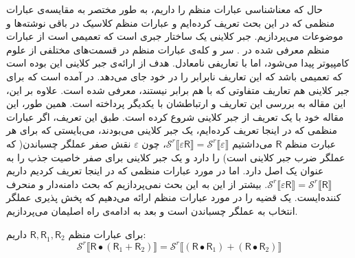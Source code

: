 حال که معناشناسی عبارات منظم را داریم، به طور مختصر به مقایسه‌ی عبارات منظمی که در این بحث تعریف کرده‌ایم و عبارات منظم کلاسیک در باقی نوشته‌ها و موضوعات می‌پردازیم. جبر کلاینی یک ساختار جبری است که تعمیمی است از عبارات منظم معرفی شده در \cite{kleene56}. سر و کله‌ی عبارات منظم در قسمت‌های مختلفی از علوم کامپیوتر پیدا می‌شود، اما با تعاریفی نامعادل. هدف از ارائه‌ی جبر کلاینی این بوده است که تعمیمی باشد که این تعاریف نابرابر را در خود جای می‌دهد. در \cite{DexterKleene} آمده است که برای جبر کلاینی هم تعاریف متفاوتی که با هم برابر نیستند، معرفی شده است. علاوه بر این، این مقاله به بررسی این تعاریف و ارتباطشان با یکدیگر پرداخته است. همین طور، این مقاله خود با یک تعریف از جبر کلاینی شروع کرده است. طبق این تعریف، اگر عبارات منظمی که در اینجا تعریف کرده‌ایم، یک جبر کلاینی می‌بودند، می‌بایستی که برای هر عبارت منظم $\mathsf{R}$ می‌داشتیم
$\mathcal{S}^r \llbracket \mathsf{\varepsilon R} \rrbracket = \mathcal{S}^r \llbracket \mathsf{\varepsilon} \rrbracket$،
چون $\varepsilon$ نقش صفر عملگر چسباندن( که عملگر ضرب جبر کلاینی است) را دارد و یک جبر کلاینی برای صفر خاصیت جذب را به عنوان یک اصل دارد. اما در مورد عبارات منظمی که در اینجا تعریف کردیم داریم 
$\mathcal{S}^r \llbracket \mathsf{\varepsilon R} \rrbracket = \mathcal{S}^r \llbracket \mathsf{R} \rrbracket$.
بیشتر از این به این بحث نمی‌پردازیم که بحث دامنه‌دار و منحرف کننده‌ایست. یک قضیه را در مورد عبارات منظم ارائه می‌دهیم که پخش پذیری عملگر انتخاب به عملگر چسباندن است و بعد به ادامه‌ی راه اصلیمان می‌پردازیم.
\begin{thm}
	برای عبارات منظم
	 $\mathsf{R , R}_1,\mathsf{R}_2$
	 داریم:
	  $$\mathcal{S}^r \llbracket \mathsf{R}\bullet (\mathsf{R}_1 + \mathsf{R}_2) \rrbracket = \mathcal{S}^r \llbracket (\mathsf{R \bullet R}_1) + (\mathsf{R \bullet R}_2) \rrbracket $$
\end{thm}

